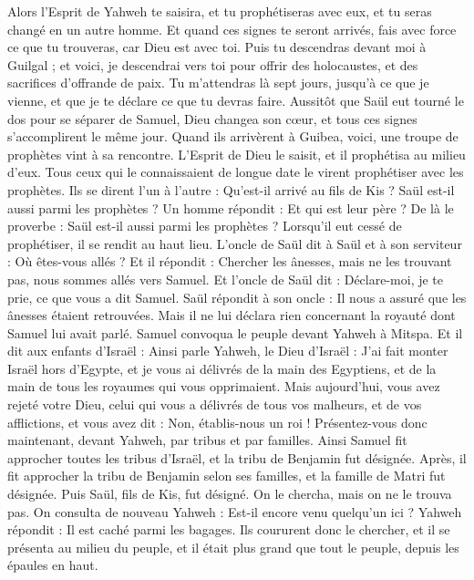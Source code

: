 \begin{multicols}{2}
Alors l'Esprit de Yahweh te saisira, et tu prophétiseras avec eux, et tu seras changé en un autre homme.
Et quand ces signes te seront arrivés, fais avec force ce que tu trouveras, car Dieu est avec toi.
Puis tu descendras devant moi à Guilgal ; et voici, je descendrai vers toi pour offrir des holocaustes, et des sacrifices d'offrande de paix. Tu m'attendras là sept jours, jusqu'à ce que je vienne, et que je te déclare ce que tu devras faire.
Aussitôt que Saül eut tourné le dos pour se séparer de Samuel, Dieu changea son cœur, et tous ces signes s'accomplirent le même jour.
Quand ils arrivèrent à Guibea, voici, une troupe de prophètes vint à sa rencontre. L'Esprit de Dieu le saisit, et il prophétisa au milieu d'eux.
Tous ceux qui le connaissaient de longue date le virent prophétiser avec les prophètes. Ils se dirent l'un à l'autre : Qu'est-il arrivé au fils de Kis ? Saül est-il aussi parmi les prophètes ?
Un homme répondit : Et qui est leur père ? De là le proverbe : Saül est-il aussi parmi les prophètes ?
Lorsqu'il eut cessé de prophétiser, il se rendit au haut lieu.
L'oncle de Saül dit à Saül et à son serviteur : Où êtes-vous allés ? Et il répondit : Chercher les ânesses, mais ne les trouvant pas, nous sommes allés vers Samuel.
Et l'oncle de Saül dit : Déclare-moi, je te prie, ce que vous a dit Samuel.
Saül répondit à son oncle : Il nous a assuré que les ânesses étaient retrouvées. Mais il ne lui déclara rien concernant la royauté dont Samuel lui avait parlé.
Samuel convoqua le peuple devant Yahweh à Mitspa.
Et il dit aux enfants d'Israël : Ainsi parle Yahweh, le Dieu d'Israël : J'ai fait monter Israël hors d'Egypte, et je vous ai délivrés de la main des Egyptiens, et de la main de tous les royaumes qui vous opprimaient.
Mais aujourd'hui, vous avez rejeté votre Dieu, celui qui vous a délivrés de tous vos malheurs, et de vos afflictions, et vous avez dit : Non, établis-nous un roi ! Présentez-vous donc maintenant, devant Yahweh, par tribus et par familles.
Ainsi Samuel fit approcher toutes les tribus d'Israël, et la tribu de Benjamin fut désignée.
Après, il fit approcher la tribu de Benjamin selon ses familles, et la famille de Matri fut désignée. Puis Saül, fils de Kis, fut désigné. On le chercha, mais on ne le trouva pas.
On consulta de nouveau Yahweh : Est-il encore venu quelqu'un ici ? Yahweh répondit : Il est caché parmi les bagages.
Ils coururent donc le chercher, et il se présenta au milieu du peuple, et il était plus grand que tout le peuple, depuis les épaules en haut.

\end{multicols}
